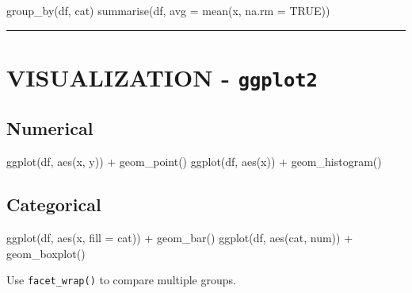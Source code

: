 \documentclass[
  english,
  8pt,
  letterpaper,
  DIV=11,
  numbers=noendperiod]{scrartcl}
\newenvironment{Shaded}{\begin{snugshade}}{\end{snugshade}}
\newcommand{\AttributeTok}[1]{\textcolor[rgb]{0.40,0.45,0.13}{#1}}
\newcommand{\ConstantTok}[1]{\textcolor[rgb]{0.56,0.35,0.01}{#1}}
\newcommand{\FunctionTok}[1]{\textcolor[rgb]{0.28,0.35,0.67}{#1}}
\newcommand{\NormalTok}[1]{\textcolor[rgb]{0.00,0.23,0.31}{#1}}
\newcommand{\SpecialCharTok}[1]{\textcolor[rgb]{0.37,0.37,0.37}{#1}}
\begin{document}
\begin{Shaded}
\begin{Highlighting}[]
\FunctionTok{group\_by}\NormalTok{(df, cat)}
\FunctionTok{summarise}\NormalTok{(df, }\AttributeTok{avg =} \FunctionTok{mean}\NormalTok{(x, }\AttributeTok{na.rm =} \ConstantTok{TRUE}\NormalTok{))}
\end{Highlighting}
\end{Shaded}

\begin{center}\rule{0.5\linewidth}{0.5pt}\end{center}

\section{\texorpdfstring{ VISUALIZATION -
\texttt{ggplot2}}{ VISUALIZATION - ggplot2}}\label{visualization-ggplot2}

\subsection{Numerical}\label{numerical}

\begin{Shaded}
\begin{Highlighting}[]
\FunctionTok{ggplot}\NormalTok{(df, }\FunctionTok{aes}\NormalTok{(x, y)) }\SpecialCharTok{+} \FunctionTok{geom\_point}\NormalTok{()}
\FunctionTok{ggplot}\NormalTok{(df, }\FunctionTok{aes}\NormalTok{(x)) }\SpecialCharTok{+} \FunctionTok{geom\_histogram}\NormalTok{()}
\end{Highlighting}
\end{Shaded}

\subsection{Categorical}\label{categorical}

\begin{Shaded}
\begin{Highlighting}[]
\FunctionTok{ggplot}\NormalTok{(df, }\FunctionTok{aes}\NormalTok{(x, }\AttributeTok{fill =}\NormalTok{ cat)) }\SpecialCharTok{+} \FunctionTok{geom\_bar}\NormalTok{()}
\FunctionTok{ggplot}\NormalTok{(df, }\FunctionTok{aes}\NormalTok{(cat, num)) }\SpecialCharTok{+} \FunctionTok{geom\_boxplot}\NormalTok{()}
\end{Highlighting}
\end{Shaded}

Use \texttt{facet\_wrap()} to compare multiple groups.
\end{document}
